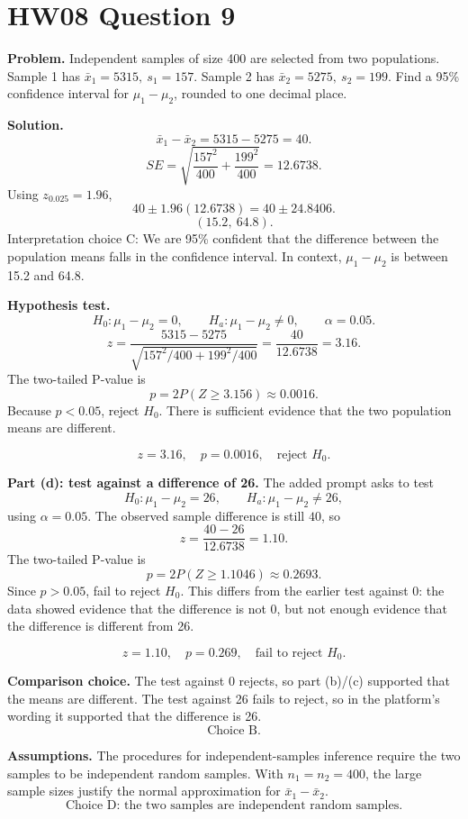 \documentclass[11pt]{article}
\begin{document}
\section*{HW08 Question 9}

\textbf{Problem.} Independent samples of size 400 are selected from two populations. Sample 1 has \(\bar{x}_1=5315,\ s_1=157\). Sample 2 has \(\bar{x}_2=5275,\ s_2=199\). Find a 95\% confidence interval for \(\mu_1-\mu_2\), rounded to one decimal place.

\textbf{Solution.}
\[
\bar{x}_1-\bar{x}_2=5315-5275=40.
\]
\[
SE=\sqrt{\frac{157^2}{400}+\frac{199^2}{400}}=12.6738.
\]
Using \(z_{0.025}=1.96\),
\[
40\pm1.96(12.6738)=40\pm24.8406.
\]
\[
\boxed{(15.2,\ 64.8)}.
\]
Interpretation choice C: We are 95\% confident that the difference between the population means falls in the confidence interval. In context, \(\mu_1-\mu_2\) is between 15.2 and 64.8.

\textbf{Hypothesis test.}
\[
H_0:\mu_1-\mu_2=0,\qquad H_a:\mu_1-\mu_2\ne0,\qquad \alpha=0.05.
\]
\[
z=\frac{5315-5275}{\sqrt{157^2/400+199^2/400}}
=\frac{40}{12.6738}=3.16.
\]
The two-tailed P-value is
\[
p=2P(Z\ge3.156)\approx0.0016.
\]
Because \(p<0.05\), reject \(H_0\). There is sufficient evidence that the two population means are different.

\[
\boxed{z=3.16,\quad p=0.0016,\quad \text{reject }H_0.}
\]

\textbf{Part (d): test against a difference of 26.} The added prompt asks to test
\[
H_0:\mu_1-\mu_2=26,\qquad H_a:\mu_1-\mu_2\ne26,
\]
using \(\alpha=0.05\). The observed sample difference is still \(40\), so
\[
z=\frac{40-26}{12.6738}=1.10.
\]
The two-tailed P-value is
\[
p=2P(Z\ge1.1046)\approx0.2693.
\]
Since \(p>0.05\), fail to reject \(H_0\). This differs from the earlier test against 0: the data showed evidence that the difference is not 0, but not enough evidence that the difference is different from 26.

\[
\boxed{z=1.10,\quad p=0.269,\quad \text{fail to reject }H_0.}
\]

\textbf{Comparison choice.} The test against 0 rejects, so part (b)/(c) supported that the means are different. The test against 26 fails to reject, so in the platform's wording it supported that the difference is 26.
\[
\boxed{\text{Choice B.}}
\]

\textbf{Assumptions.} The procedures for independent-samples inference require
the two samples to be independent random samples. With \(n_1=n_2=400\), the
large sample sizes justify the normal approximation for \(\bar{x}_1-\bar{x}_2\).
\[
\boxed{\text{Choice D: the two samples are independent random samples.}}
\]
\end{document}

